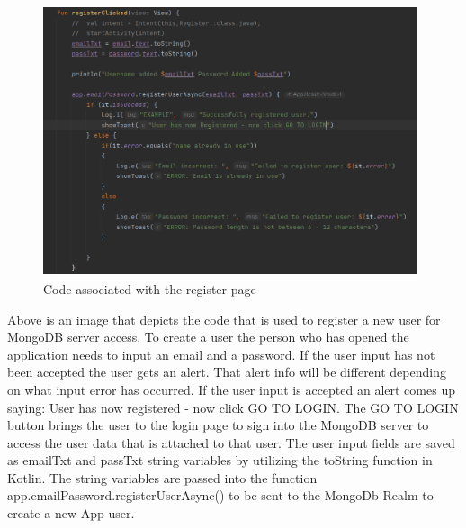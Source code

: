 \begin{figure}[H]
    \centering
    \includegraphics[width=11cm, height= 8cm]{img/registerCode.PNG}
    \caption{Code associated with the register page}
    \label{fig:altas config}
\end{figure}
Above is an image that depicts the code that is used to register a new user for MongoDB server access. To create a user the person who has opened the application needs to input an email and a password. If the user input has not been accepted the user gets an alert. That alert info will be different depending on what input error has occurred. If the user input is accepted an alert comes up saying: User has now registered - now click GO TO LOGIN. The GO TO LOGIN button brings the user to the login page to sign into the MongoDB server to access the user data that is attached to that user.
\newline
The user input fields are saved as emailTxt and passTxt string variables by utilizing the toString function in Kotlin. The string variables are passed into the function app.emailPassword.registerUserAsync() to be sent to the MongoDb Realm to create a new App user.


